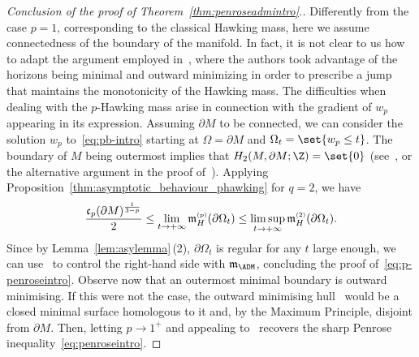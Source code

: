 \documentclass[10pt,a4paper]{amsart}
\numberwithin{equation}{section}
\newcounter{case}
\renewcommand{\ncapa}{\mathfrak{c}}
\newcommand{\ma}{\mathfrak{m}}
\newcommand{\tp}[1][p]{{\text{\tiny$(#1)$}}}
\begin{document}
\begin{proof}[Conclusion of the proof of Theorem~\ref{thm:penroseadmintro}.]
 Differently from the case $p=1$, corresponding to the classical Hawking mass, here we assume connectedness of the boundary of the manifold. In fact, it is not clear to us how to adapt the argument employed in~\cite[Section 6]{huisken_inversemeancurvatureflow_2001}, where the authors took advantage of the horizons being minimal and outward minimizing in order to prescribe a jump that maintains the monotonicity of the Hawking mass. The difficulties when dealing with the $p$-Hawking mass arise in connection with the gradient of $w_p$ appearing in its expression. Assuming $\partial M$ to be connected, we can consider the solution $w_p$ to~\eqref{eq:pb-intro} starting at $\Omega= \partial M$ and $\Omega_t= \set{w_p\leq t}$.
The boundary of $M$ being outermost implies that $H_2(M, \partial M; \Z)= \set{0}$ (see~\cite[Lemma 4.1]{huisken_inversemeancurvatureflow_2001}, or the alternative argument in the proof of~\cite[Lemma 2.8]{benatti_isoperimetricriemannianpenroseinequality_2022}).
Applying Proposition~\ref{thm:asymptotic_behaviour_phawking} for $q=2$, we have
\[
 \frac{ \ncapa_{p}(\partial M)^{\frac{1}{3-p}}}{2} \leq \lim_{t \to +\infty} \ma^{\tp}_H(\partial \Omega_t) \leq \limsup_{t \to +\infty} \ma^{\tp[2]}_H(\partial \Omega_t).
\]
Since by Lemma~\ref{lem:asylemma}\,(2), $\partial \Omega_t$ is regular for any $t$ large enough, we can use~\cite[Theorem~4.11]{benatti_isoperimetricriemannianpenroseinequality_2022} to control the right-hand side with $\ma_{\ADM}$, concluding the proof of~\eqref{eq:p-penroseintro}. Observe now that an outermost minimal boundary is outward minimising. If this were not the case, the outward minimising hull~\cite{fogagnolo_minimisinghullscapacityisoperimetric_2022, huisken_inversemeancurvatureflow_2001} would be a closed minimal surface homologous to it and, by the Maximum Principle, disjoint from $\partial M$. Then, letting $p \to 1^+$ and appealing to~\cite[Theorem~1.2]{fogagnolo_minimisinghullscapacityisoperimetric_2022} recovers the sharp Penrose inequality~\eqref{eq:penroseintro}.
\end{proof}
\end{document}
